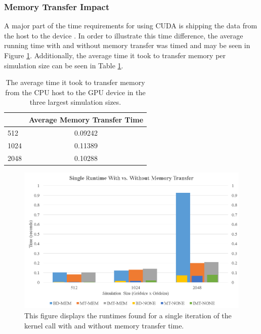 \subsubsection{Memory Transfer Impact}
A major part of the time requirements for using CUDA is shipping the data from the host to the device \cite{cudabyexample}. In order to illustrate this time difference, the average running time with and without memory transfer was timed and may be seen in Figure \ref{fig:mem_comp}. Additionally, the average time it took to transfer memory per simulation size can be seen in Table \ref{table:mem_time}.
\begin{table}[H]
\centering
\caption{The average time it took to transfer memory from the CPU host to the GPU device in the three largest simulation sizes.}
\label{table:mem_time}
\begin{tabular}{l|c|}
\cline{2-2}
                           & \multicolumn{1}{l|}{Average Memory Transfer Time} \\ \hline
\multicolumn{1}{|l|}{512}  & 0.09242                                           \\ \hline
\multicolumn{1}{|l|}{1024} & 0.11389                                           \\ \hline
\multicolumn{1}{|l|}{2048} & 0.10288                                           \\ \hline
\end{tabular}
\end{table} 
\begin{figure}[H]
\centering
  \includegraphics[height=.4\textheight]{figures/results/mem_compare.png}
  \caption{This figure displays the runtimes found for a single iteration of the kernel call with and without memory transfer time.}
  \label{fig:mem_comp}
\end{figure} 

